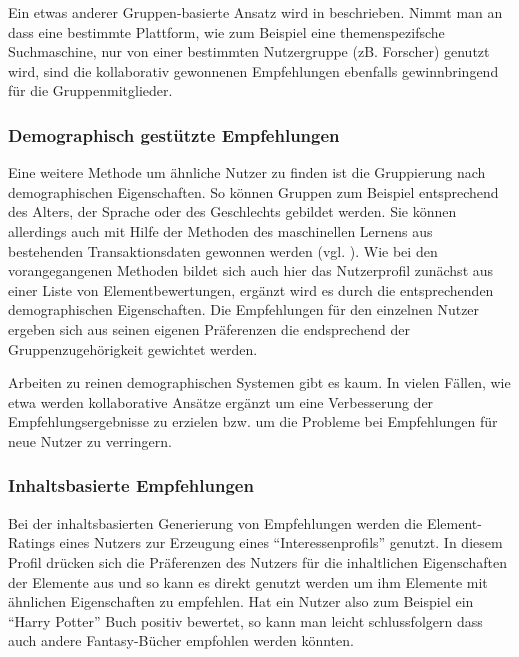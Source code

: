 Ein etwas anderer Gruppen-basierte Ansatz wird in \citep{smyth05a} beschrieben. Nimmt man an dass eine bestimmte Plattform, wie zum Beispiel eine themenspezifsche Suchmaschine, nur von einer bestimmten Nutzergruppe (zB. Forscher) genutzt wird, sind die kollaborativ gewonnenen Empfehlungen ebenfalls gewinnbringend für die Gruppenmitglieder.

\subsubsection{Demographisch gestützte Empfehlungen}
Eine weitere Methode um ähnliche Nutzer zu finden ist die Gruppierung nach demographischen Eigenschaften. So können Gruppen zum Beispiel entsprechend des Alters, der Sprache oder des Geschlechts gebildet werden. Sie können allerdings auch mit Hilfe der Methoden des maschinellen Lernens aus bestehenden Transaktionsdaten gewonnen werden (vgl. \citep{Burke:2002:HRS:586321.586352}). Wie bei den vorangegangenen Methoden bildet sich auch hier das Nutzerprofil zunächst aus einer Liste von Elementbewertungen, ergänzt wird es durch die entsprechenden demographischen Eigenschaften. Die Empfehlungen für den einzelnen Nutzer ergeben sich aus seinen eigenen Präferenzen die endsprechend der Gruppenzugehörigkeit gewichtet werden.

Arbeiten zu reinen demographischen Systemen gibt es kaum. In vielen Fällen, wie etwa \citep{Vozalis:2007:USD:1243505.1243639} werden kollaborative Ansätze ergänzt  um eine Verbesserung der Empfehlungsergebnisse zu erzielen bzw. um die Probleme bei Empfehlungen für neue Nutzer zu verringern. \citep{Burke:2002:HRS:586321.586352}

\subsubsection{Inhaltsbasierte Empfehlungen}
Bei der inhaltsbasierten Generierung von Empfehlungen werden die Element-Ratings eines Nutzers zur Erzeugung eines ``Interessenprofils'' genutzt. In diesem Profil drücken sich die Präferenzen des Nutzers für die inhaltlichen Eigenschaften der Elemente aus und so kann es direkt genutzt werden um ihm Elemente mit ähnlichen Eigenschaften zu empfehlen. Hat ein Nutzer also zum Beispiel ein ``Harry Potter'' Buch positiv bewertet, so kann man leicht schlussfolgern dass auch andere Fantasy-Bücher empfohlen werden könnten.

